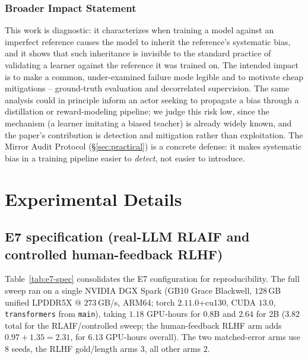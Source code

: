 \documentclass[10pt]{article} %
\theoremstyle{plain}
\theoremstyle{remark}
\begin{document}
\subsubsection*{Broader Impact Statement}
This work is diagnostic: it characterizes when training a model against an imperfect reference causes the model to inherit the reference's systematic bias, and it shows that such inheritance is invisible to the standard practice of validating a learner against the reference it was trained on. The intended impact is to make a common, under-examined failure mode legible and to motivate cheap mitigations -- ground-truth evaluation and decorrelated supervision. The same analysis could in principle inform an actor seeking to propagate a bias through a distillation or reward-modeling pipeline; we judge this risk low, since the mechanism (a learner imitating a biased teacher) is already widely known, and the paper's contribution is detection and mitigation rather than exploitation. The Mirror Audit Protocol (\S\ref{sec:practical}) is a concrete defense: it makes systematic bias in a training pipeline easier to \emph{detect}, not easier to introduce.




\clearpage
\appendix

\section{Experimental Details}

\subsection{E7 specification (real-LLM RLAIF and controlled human-feedback RLHF)}
\label{app:e7}
Table~\ref{tab:e7-spec} consolidates the E7 configuration for reproducibility. The full sweep ran on a single NVIDIA DGX Spark (GB10 Grace Blackwell, $128$\,GB unified LPDDR5X @ $273$\,GB/s, ARM64; torch $2.11.0$+cu130, CUDA $13.0$, \texttt{transformers} from \texttt{main}), taking $1.18$ GPU-hours for 0.8B and $2.64$ for 2B ($3.82$ total for the RLAIF/controlled sweep; the human-feedback RLHF arm adds $0.97{+}1.35=2.31$, for $6.13$ GPU-hours overall). The two matched-error arms use $8$ seeds, the RLHF gold/length arms $3$, all other arms $2$.
\end{document}
